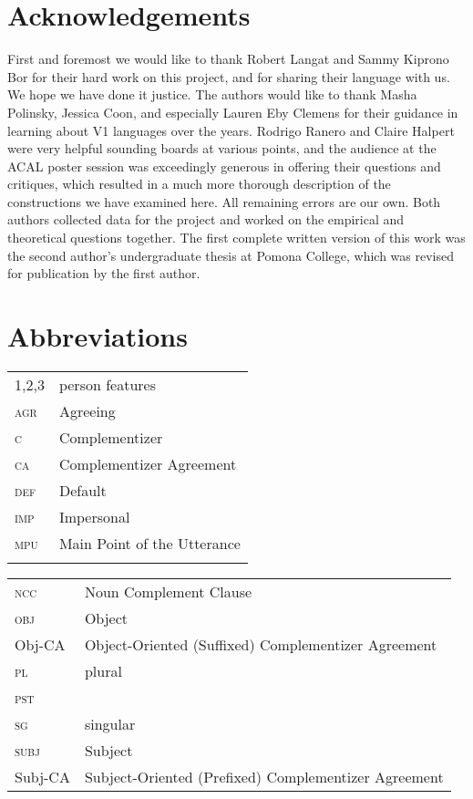 \documentclass[output=paper
,newtxmath
,modfonts
,nonflat]{langsci/langscibook}
\begin{document}
\section*{Acknowledgements}
First and foremost we would like to thank Robert Langat and Sammy Kiprono Bor for their hard work on this project, and for sharing their language with us. We hope we have done it justice. The authors would like to thank Masha Polinsky, Jessica Coon, and especially Lauren Eby Clemens for their guidance in learning about V1 languages over the years. Rodrigo Ranero and Claire Halpert were very helpful sounding boards at various points, and the audience at the ACAL poster session was exceedingly generous in offering their questions and critiques, which resulted in a much more thorough description of the constructions we have examined here. All remaining errors are our own. Both authors collected data for the project and worked on the empirical and theoretical questions together. The first complete written version of this work was the second author's undergraduate thesis at Pomona College, which was revised for publication by the first author. 

\newpage

\section*{Abbreviations}
 
 
 
 \begin{tabularx}{.45\textwidth}{lQ}
   1,2,3 & person features  \\
   \textsc{agr} & Agreeing \\
   \textsc{c} & Complementizer \\
   \textsc{ca} & Complementizer Agreement \\
   \textsc{def} & Default \\
   \textsc{imp} & Impersonal \\ 
   \textsc{mpu} & Main Point of the Utterance \\  
   \\
 \end{tabularx}
 \begin{tabularx}{.54\textwidth}{lQ}
   \textsc{ncc} & Noun Complement Clause \\   
   \textsc{obj} & Object \\
   Obj-CA & Object-Oriented (Suffixed) Complementizer Agreement \\
   \textsc{pl} & plural \\
   \textsc{pst} &  \\
   \textsc{sg} & singular \\
   \textsc{subj} & Subject \\
   Subj-CA & Subject-Oriented (Prefixed) Complementizer Agreement \\
 \end{tabularx} 

\sloppy
\printbibliography[heading=subbibliography,notkeyword=this]
\end{document}
